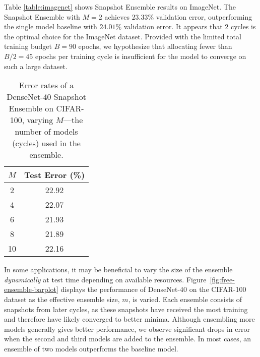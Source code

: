 
Table \ref{table:imagenet} shows Snapshot Ensemble results on ImageNet.
The Snapshot Ensemble with $M=2$ achieves $23.33 \%$ validation error, outperforming the single model baseline with $24.01\%$ validation error. It appears that 2 cycles is the optimal choice for the ImageNet dataset.
Provided with the limited total training budget $B=90$ epochs, we hypothesize that allocating fewer than $B/2 = 45$ epochs per training cycle is insufficient for the model to converge on such a large dataset.


\begin{wraptable}{r}{0.25\textwidth}
\centering
\small
\begin{tabular}{cc}
\toprule
{$M$} & {\bf Test Error (\%)} \\
\midrule
2 & 22.92 \\
4 & 22.07 \\
6 & 21.93 \\
8 & 21.89 \\
10 & 22.16\\
\bottomrule
\end{tabular}
\caption[]{\small Error rates of a DenseNet-40 Snapshot Ensemble on CIFAR-100, varying $M$---the number of models (cycles) used in the ensemble.}
\label{table:vary-block}
 \end{wraptable}


 In some applications, it may be beneficial to vary the size of the ensemble \emph{dynamically} at test time depending on available resources. Figure~\ref{fig:free-ensemble-barplot} displays the performance of DenseNet-40 on the CIFAR-100 dataset as the effective ensemble size, $m$, is varied. Each ensemble consists of snapshots from later cycles, as these snapshots have received the most training and therefore have likely converged to better minima. Although ensembling more models generally gives better performance, we observe significant drops in error when the second and third models are added to the ensemble. In most cases, an ensemble of two models outperforms the baseline model.

